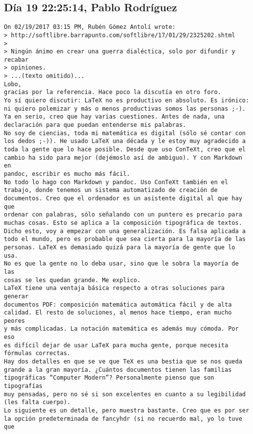 \documentclass[a4paper,10pt]{article}
\begin{document}
\subsection{Día 19 22:25:14, Pablo Rodríguez}

\begin{lstlisting}
On 02/19/2017 03:15 PM, Rubén Gómez Antolí wrote:
> http://softlibre.barrapunto.com/softlibre/17/01/29/2325202.shtml
> 
> Ningún ánimo en crear una guerra dialéctica, solo por difundir y recabar
> opiniones.
> ...(texto omitido)...
Lobo,
gracias por la referencia. Hace poco la discutía en otro foro.
Yo sí quiero discutir: LaTeX no es productivo en absoluto. Es irónico:
ni quiero polemizar y más o menos productivas somos las personas ;-).
Ya en serio, creo que hay varias cuestiones. Antes de nada, una
declaración para que puedan entenderse mis palabras.
No soy de ciencias, toda mi matemática es digital (sólo sé contar con
los dedos ;-)). He usado LaTeX una década y le estoy muy agradecido a
toda la gente que lo hace posible. Desde que uso ConTeXt, creo que el
cambio ha sido para mejor (dejémoslo así de ambiguo). Y con Markdown en
pandoc, escribir es mucho más fácil.
No todo lo hago con Markdown y pandoc. Uso ConTeXt también en el
trabajo, donde tenemos un sistema automatizado de creación de
documentos. Creo que el ordenador es un asistente digital al que hay que
ordenar con palabras, sólo señalando con un puntero es precario para
muchas cosas. Esto se aplica a la composición tipográfica de textos.
Dicho esto, voy a empezar con una generalización. Es falsa aplicada a
todo el mundo, pero es probable que sea cierta para la mayoría de las
personas. LaTeX es demasiado quizá para la mayoría de gente que lo usa.
No es que la gente no lo deba usar, sino que le sobra la mayoría de las
cosas se les quedan grande. Me explico.
LaTeX tiene una ventaja básica respecto a otras soluciones para generar
documentos PDF: composición matemática automática fácil y de alta
calidad. El resto de soluciones, al menos hace tiempo, eran mucho peores
y más complicadas. La notación matemática es además muy cómoda. Por eso
es difícil dejar de usar LaTeX para mucha gente, porque necesita
fórmulas correctas.
Hay dos detalles en que se ve que TeX es una bestia que se nos queda
grande a la gran mayoría. ¿Cuántos documentos tienen las familias
tipográficas “Computer Modern”? Personalmente pienso que son tipografías
muy pensadas, pero no sé si son excelentes en cuanto a su legibilidad
(les falta cuerpo).
Lo siguiente es un detalle, pero muestra bastante. Creo que es por ser
la opción predeterminada de fancyhdr (si no recuerdo mal, yo lo tuve que

\end{lstlisting}
\end{document}
